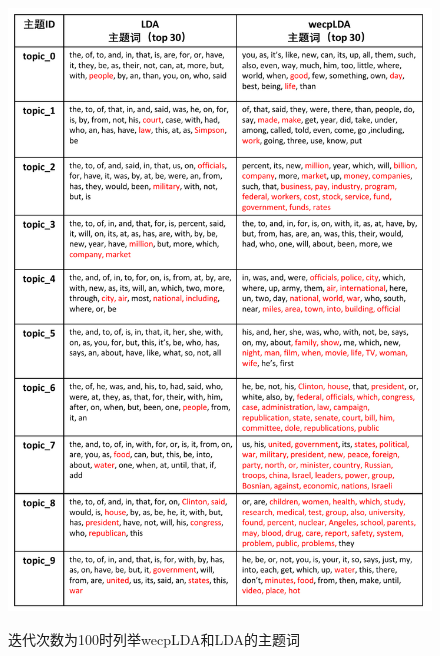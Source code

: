 \documentclass[master]{njuthesis}
\begin{document}
\begin{figure}[htbp]
  \centering
  \includegraphics[width= 1.0\textwidth]{figures//twords_iter100_chap5.pdf}\\
  \caption{迭代次数为100时列举wecpLDA和LDA的主题词}\label{fig:twords_iter100_chap5}
\end{figure}
\end{document}
